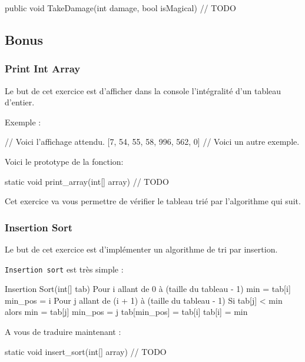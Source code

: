 \begin{code}
public void TakeDamage(int damage, bool isMagical)
{	
	// TODO
}
\end{code}

\newpage
\subsection{Bonus}

\subsubsection{Print Int Array}

Le but de cet exercice est d'afficher dans la console l'intégralité d'un tableau d'entier.

Exemple :

\begin{code}
[0, 34, 5, 55, 666, 33, 23, 2] // Voici l'affichage attendu.
[7, 54, 55, 58, 996, 562, 0] // Voici un autre exemple.
\end{code}

Voici le prototype de la fonction:
\begin{code}
 static void print_array(int[] array)
{
	// TODO
}
\end{code}

Cet exercice va vous permettre de vérifier le tableau trié par l'algorithme qui suit.

\subsubsection{Insertion Sort}

Le but de cet exercice est d'implémenter un algorithme de tri par insertion.

\texttt{Insertion sort} est très simple : 

\begin{code}
Insertion Sort(int[] tab)
	Pour i allant de 0 à (taille du tableau - 1)
		min = tab[i]
        min_pos = i
        Pour j allant de (i + 1) à (taille du tableau - 1)
        	Si tab[j] < min alors
            	min = tab[j]
                min_pos = j
       	tab[min_pos] = tab[i]
        tab[i] = min
\end{code}

A vous de traduire maintenant :

\begin{code}
static void insert_sort(int[] array)
{
 	// TODO
}
\end{code}

